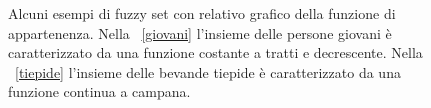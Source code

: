 \documentclass [11pt,a4paper,twoside,openright] {book}
\begin{document}
\begin{figure}[!h]
        \centering%
        \qquad\qquad
          \caption{Alcuni esempi di fuzzy set con relativo grafico della funzione di appartenenza. Nella \figurename~\ref{giovani} l'insieme delle persone giovani è caratterizzato da una funzione costante a tratti e decrescente. Nella \figurename~\ref{tiepide} l'insieme delle bevande tiepide è caratterizzato da una funzione continua a campana.}
\end{figure}
\end{document}

